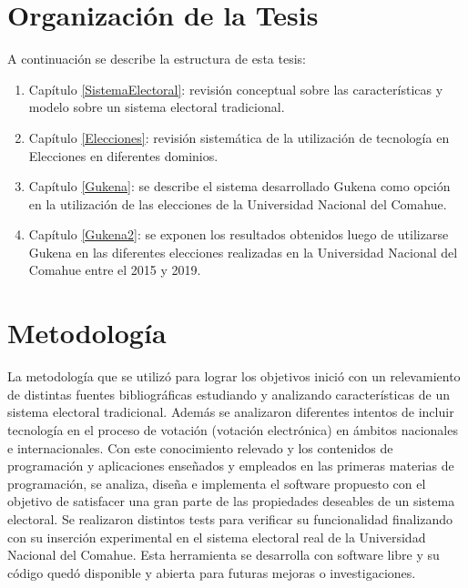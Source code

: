 \section{Organización de la Tesis}
A continuación se describe la estructura de esta tesis:
\begin{enumerate}
    \item Capítulo \ref{SistemaElectoral}: revisión conceptual sobre las características y modelo sobre un sistema electoral tradicional.
    \item Capítulo \ref{Elecciones}: revisión sistemática de la utilización de tecnología en  Elecciones en diferentes dominios.
    \item Capítulo \ref{Gukena}: se describe el sistema desarrollado Gukena como opción en la utilización de las elecciones de la Universidad Nacional del Comahue.
    \item Capítulo \ref{Gukena2}: se exponen los resultados obtenidos luego de utilizarse Gukena en las diferentes elecciones realizadas en la Universidad Nacional del Comahue entre el 2015 y 2019.
\end{enumerate}

\section{Metodología}
La metodología que se utilizó para lograr los objetivos inició con un relevamiento de distintas fuentes bibliográficas estudiando y analizando características de un sistema electoral tradicional.
Además se analizaron diferentes intentos de incluir tecnología en el proceso de votación (votación electrónica) en ámbitos nacionales e internacionales. Con este conocimiento relevado y los contenidos de programación y aplicaciones enseñados y empleados en las primeras materias de programación, se analiza, diseña e implementa el software propuesto con el objetivo de satisfacer una gran parte de las propiedades deseables de un sistema electoral. Se realizaron distintos tests para verificar su funcionalidad finalizando con su inserción experimental en el sistema electoral real de la Universidad Nacional del Comahue. Esta herramienta se desarrolla con software libre y su código quedó disponible y abierta para futuras mejoras o investigaciones.

